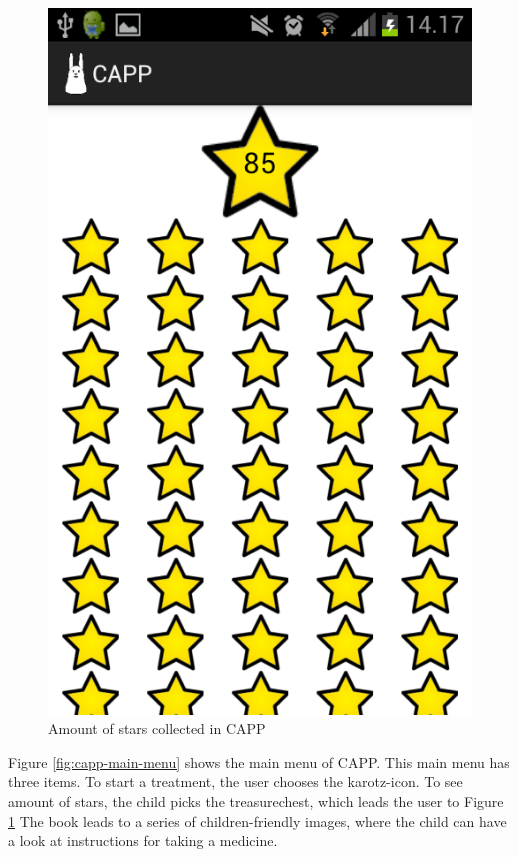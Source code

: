 \begin{figure}
	\centering
		\includegraphics[width=0.20\paperwidth]{Pictures/Screenshots/capp_stars.png}
	\caption{Amount of stars collected in CAPP}
	\label{fig:capp-stars}
\end{figure}

Figure \ref{fig:capp-main-menu} shows the main menu of CAPP. This main menu has three items. To start a treatment, the user chooses the karotz-icon. 
To see amount of stars, the child picks the treasurechest, which leads the user to Figure \ref{fig:capp-stars} 
The book leads to a series of children-friendly images, where the child can have a look at instructions for taking a medicine.   


